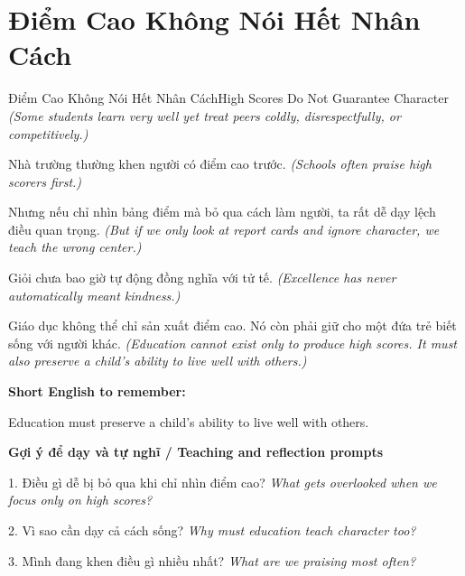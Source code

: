 \section{Điểm Cao Không Nói Hết Nhân Cách}
\begin{truyen}{Điểm Cao Không Nói Hết Nhân Cách}{High Scores Do Not Guarantee Character}
\textit{(Some students learn very well yet treat peers coldly, disrespectfully, or competitively.)}

Nhà trường thường khen người có điểm cao trước.
\textit{(Schools often praise high scorers first.)}

Nhưng nếu chỉ nhìn bảng điểm mà bỏ qua cách làm người, ta rất dễ dạy lệch điều quan trọng.
\textit{(But if we only look at report cards and ignore character, we teach the wrong center.)}

Giỏi chưa bao giờ tự động đồng nghĩa với tử tế.
\textit{(Excellence has never automatically meant kindness.)}

\end{truyen}

\begin{baihoc}
Giáo dục không thể chỉ sản xuất điểm cao. Nó còn phải giữ cho một đứa trẻ biết sống với người khác.
\textit{(Education cannot exist only to produce high scores. It must also preserve a child’s ability to live well with others.)}
\end{baihoc}

\begin{ghinhoanh}
\textbf{Short English to remember:}

Education must preserve a child’s ability to live well with others.

\end{ghinhoanh}

\begin{tuhocnhanh}
\textbf{Gợi ý để dạy và tự nghĩ / Teaching and reflection prompts}

1. Điều gì dễ bị bỏ qua khi chỉ nhìn điểm cao? \textit{What gets overlooked when we focus only on high scores?}

2. Vì sao cần dạy cả cách sống? \textit{Why must education teach character too?}

3. Mình đang khen điều gì nhiều nhất? \textit{What are we praising most often?}
\end{tuhocnhanh}
\ngancach

